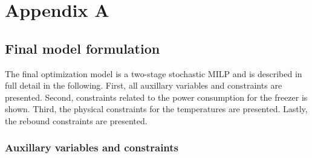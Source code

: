 {\appendices

\section*{Appendix A}\label{appendix:A}

\subsection{Final model formulation}\label{sec:final_model}




The final optimization model is a two-stage stochastic MILP and is described in full detail in the following. First, all auxillary variables and constraints are presented. Second, constraints related to the power consumption for the freezer is shown. Third, the physical constraints for the temperatures are presented. Lastly, the rebound constraints are presented.


\subsubsection{Auxillary variables and constraints}\label{sec:aux_constraints}

}
